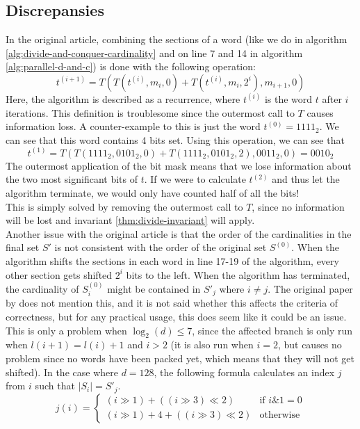 \subsection{Discrepansies}
In the original article, combining the sections of a word (like we do in algorithm \ref{alg:divide-and-conquer-cardinality} and on line 7 and 14 in algorithm \ref{alg:parallel-d-and-c}) is done with the following operation:
$$t^{(i+1)}=T(T(t^{(i)}, m_i, 0) + T(t^{(i)}, m_i, 2^i), m_{i+1}, 0)$$
Here, the algorithm is described as a recurrence, where $t^{(i)}$ is the word $t$ after $i$ iterations. This definition is troublesome since the outermost call to $T$ causes information loss. A counter-example to this is just the word $t^{(0)} = 1111_2$. We can see that this word contains 4 bits set. Using this operation, we can see that 
$$t^{(1)}=T(T(1111_2, 0101_2, 0) + T(1111_2, 0101_2, 2), 0011_2, 0) = 0010_2$$
The outermost application of the bit mask means that we lose information about the two most significant bits of $t$. If we were to calculate $t^{(2)}$ and thus let the algorithm terminate, we would only have counted half of all the bits!\\
This is simply solved by removing the outermost call to $T$, since no information will be lost and invariant \ref{thm:divide-invariant} will apply.\\
Another issue with the original article is that the order of the cardinalities in the final set $S'$ is not consistent with the order of the original set $S^{(0)}$.
When the algorithm shifts the sections in each word in line 17-19 of the algorithm, every other section gets shifted $2^i$ bits to the left. 
When the algorithm has terminated, the cardinality of $S^{(0)}_i$ might be contained in $S'_j$ where $i\not = j$. The original paper by \citet{fast-similarity-search} does not mention this, and it is not said whether this affects the criteria of correctness, but for any practical usage, this does seem like it could be an issue. 
This is only a problem when $\log_2(d) \leq 7$, since the affected branch is only run when $l(i + 1) = l(i) + 1$ and $i > 2$ (it is also run when $i=2$, but causes no problem since no words have been packed yet, which means that they will not get shifted). In the case where $d=128$, the following formula calculates an index $j$ from $i$ such that $|S_i|=S'_j$.\\
$$
j(i) =
\begin{cases}
    (i \gg 1) + ((i \gg 3) \ll 2) & \textrm{if }i \& 1 = 0 \\
    (i \gg 1) + 4 + ((i \gg 3) \ll 2) & \textrm{otherwise}
\end{cases}
$$
